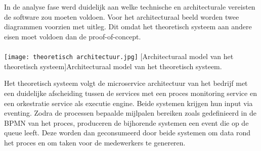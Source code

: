 
\chapter{}%
\label{ch:proof-of-concept}
\section{}%
\label{sec:design}
\subsection{}%
\label{subsec:architecturaal model}
In de analyse fase werd duidelijk aan welke technische en architecturale vereisten de software zou moeten voldoen. Voor het architecturaal beeld worden twee diagrammen voorzien met uitleg. Dit omdat het theoretisch systeem aan andere eisen moet voldoen dan de proof-of-concept.
\subsubsection{}%
\label{subsubsec:architect theoretisch systeem}
\begin{center}
  \captionsetup{type=figure}
  \texttt{[image: theoretisch architectuur.jpg]}
  [Architecturaal model van het theoretisch systeem]{Architecturaal model van het theoretisch systeem.}
\end{center}
Het theoretisch systeem volgt de microservice architectuur van het bedrijf met een duidelijke afscheiding tussen de services met een proces monitoring service en een orkestratie service als executie engine. Beide systemen krijgen hun input via eventing. Zodra de processen bepaalde mijlpalen bereiken zoals gedefinieerd in de BPMN van het proces, produceren de bijhorende systemen een event die op de queue leeft. Deze worden dan geconsumeerd door beide systemen om data rond het proces en om taken voor de medewerkers te genereren. \newline

